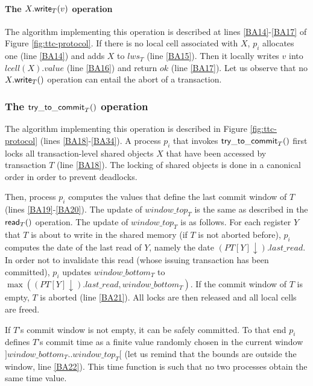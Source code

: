 \paragraph{The  $X.{\sf write}_T(v)$ operation}
The algorithm implementing this operation is described at lines 
\ref{BA14}-\ref{BA17} of Figure \ref{fig:ttc-protocol}.
If there is no local cell associated with $X$, $p_i$ allocates one 
(line \ref{BA14}) and adds $X$ to $lws_T$ (line \ref{BA15}). 
Then it locally writes $v$ into $lcell(X).value$   (line \ref{BA16})
and return $ok$  (line \ref{BA17}).
%
Let  us observe  that  no $X.{\sf write}_T()$ operation can  entail 
the abort of a transaction. 





\subsubsection{The ${\sf try\_to\_commit}_T()$ operation}
The algorithm implementing this operation is described in Figure 
\ref{fig:ttc-protocol} (lines \ref{BA18}-\ref{BA34}). 
A process $p_i$ that invokes ${\sf try\_to\_commit}_T()$ first locks all 
transaction-level shared objects $X$ that have been accessed by 
transaction $T$  (line  \ref{BA18}). The locking of shared  objects is done
in a canonical order in order to prevent deadlocks.


Then, process $p_i$  computes the values that define the last commit window 
of $T$ (lines  \ref{BA19}-\ref{BA20}).
The update of $\mathit{window\_top}_T$ is the same as
described in the ${\sf read}_T()$ operation. 
The update of $\mathit{window\_top}_T$ is as follows.
For each register $Y$ that $T$ is about to write in the shared 
memory (if $T$  is not aborted before), $p_i$ computes the date of the last
read of $Y$, namely the date $(PT[Y]\downarrow).last\_read$. 
In order not to invalidate this read
(whose issuing transaction has been committed), $p_i$ updates 
$window\_bottom_T$ to  $\max((PT[Y]\downarrow).last\_read, window\_bottom_T)$. 
If the  commit window of $T$ is empty, $T$ is aborted (line \ref{BA21}).
All locks are then released and all local cells are freed.

If $T$'s commit window is not empty, it can be safely committed. 
To that end  $p_i$  defines $T$'s commit time as  a finite value randomly
chosen in the current window $]window\_bottom_T.. window\_top_T[$  
(let us remind that the  bounds are outside the  window, line \ref{BA22}).  
This  time function  is such  that no  two processes  obtain the  same time
value.  



